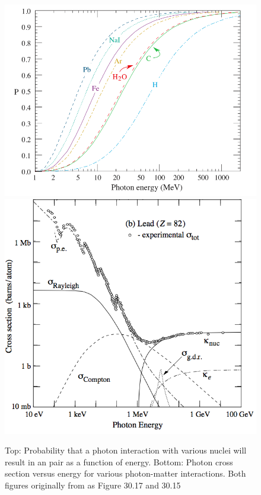 \begin{figure}[ht!]
	\centering
	\vspace{-0.5cm}
		\includegraphics[width=0.85\columnwidth]{Figures/Beringer12_30_17.png}
		\includegraphics[width=0.85\columnwidth]{Figures/Beringer12_30_15.png}
	\caption[Top:Probability of photon conversion to e$^-$ e$^+$ pair. Bottom: Photon cross section versus energy]{Top: Probability that a photon interaction with various nuclei will result in an \ee{} pair as a function of energy. Bottom: Photon cross section versus energy for various photon-matter interactions. Both figures originally from \cite{Beringer12} as Figure 30.17 and 30.15 }
	\label{fig:pairProd}
\end{figure}

